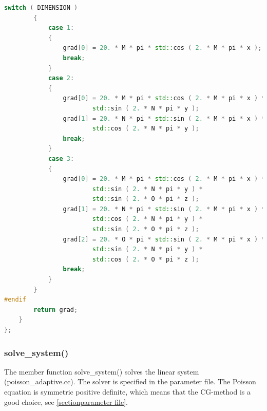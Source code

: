 \documentclass[a4paper, 11pt, twoside]{article}
\begin{document}
\begin{lstlisting}[language=C++, basicstyle={\footnotesize, \ttfamily}, keywordstyle=\color{blue}, numbers=none, tabsize=4]
        switch ( DIMENSION )
        {
            case 1:
            {
                grad[0] = 20. * M * pi * std::cos ( 2. * M * pi * x );
                break;
            }
            case 2:
            {
                grad[0] = 20. * M * pi * std::cos ( 2. * M * pi * x ) *
                        std::sin ( 2. * N * pi * y );
                grad[1] = 20. * N * pi * std::sin ( 2. * M * pi * x ) *
                        std::cos ( 2. * N * pi * y );
                break;
            }
            case 3:
            {
                grad[0] = 20. * M * pi * std::cos ( 2. * M * pi * x ) *
                        std::sin ( 2. * N * pi * y ) * 
                        std::sin ( 2. * O * pi * z );
                grad[1] = 20. * N * pi * std::sin ( 2. * M * pi * x ) *
                        std::cos ( 2. * N * pi * y ) * 
                        std::sin ( 2. * O * pi * z );
                grad[2] = 20. * O * pi * std::sin ( 2. * M * pi * x ) *
                        std::sin ( 2. * N * pi * y ) * 
                        std::cos ( 2. * O * pi * z );
                break;
            }
        }
#endif
        return grad;
    }
};

\end{lstlisting}
\subsubsection{solve\_system()}
The member function solve\_system() solves  the linear system (poisson\_adaptive.cc). 
The solver is specified in the parameter file. 
The Poisson equation is symmetric positive definite, which means that the CG-method is a good choice, see \ref{sectionparameter file}.
\end{document}

